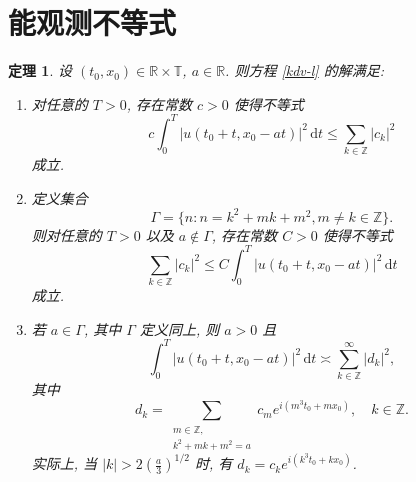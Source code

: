 \documentclass[master]{cugthesis}
\newcommand\R{\ensuremath{\mathbb{R}}}
\newcommand\Z{\ensuremath{\mathbb{Z}}}
\newcommand\T{\ensuremath{\mathbb{T}}}
\renewcommand\d{\ensuremath{\,\mathrm{d}}}
\newtheorem{theorem}{定理}[chapter]
\begin{document}
    \section{能观测不等式}
    
    \begin{theorem}\label{thm3-2-1}
    设 $(t_0,x_0)\in \R\times \T$, $a\in \R$. 则方程 \eqref{kdv-l} 的解满足:
    \begin{enumerate}
        \item[\rm{(1)}] 对任意的 $T>0$, 存在常数 $c>0$ 使得不等式
        \begin{equation}\label{3-2-1}
            c\int_0^T\left| u(t_0+t,x_0-at) \right|^2\d t \le  \sum_{k\in \Z} |c_k|^2
        \end{equation}
        成立.
        \item[\rm{(2)}] 定义集合
        \begin{equation*}
            \Gamma=\lbrace n:n=k^2+mk+m^2, m\neq k\in \Z \rbrace.
        \end{equation*}
        则对任意的 $T>0$ 以及 $a\notin \Gamma$, 存在常数 $C>0$ 使得不等式
        \begin{equation}\label{3-2-2}
            \sum_{k\in\Z} |c_k|^2 \le C \int_0^T |u(t_0+t,x_0-at)|^2 \d t
        \end{equation}
        成立.
        \item[\rm{(3)}] 若 $a\in \Gamma$, 其中 $\Gamma$ 定义同上, 则 $a>0$ 且
        \begin{equation}\label{3-2-3}
            \int_0^T |u(t_0+t,x_0-at)|^2\d t\asymp \sum_{k\in\Z}^\infty|d_k|^2,
        \end{equation}
        其中
        \begin{equation*}
            d_k=\sum_{\substack{
                m\in \Z,  \\
                k^2+mk+m^2 = a }} 
             c_me^{i(m^3t_0+mx_0)},\quad k\in \Z.
        \end{equation*}
        实际上, 当 $|k|> 2\left(\frac{a}{3}\right)^{1 /2}$ 时, 有 $d_k=c_k e^{i (k^3t_0+kx_0)}$.
    \end{enumerate}
    \end{theorem}
    
\end{document}
